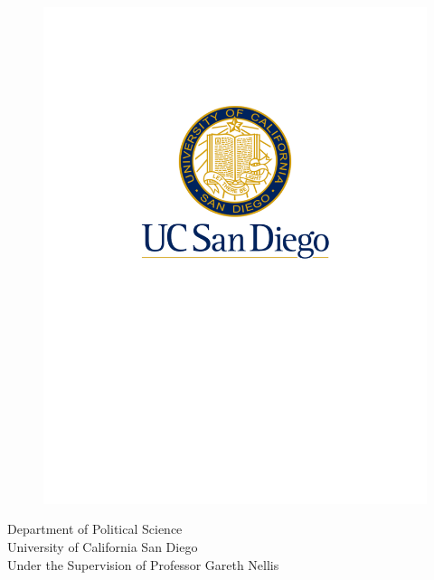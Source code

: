 \documentclass[letterpaper, 12pt]{article}
\begin{document}
\begin{titlepage}
\begingroup
\begin{figure}[!h]
    \centering
    \includegraphics[scale=0.35]{Visuals/UCSD_logo.pdf}
\end{figure}
\begin{center}
\fontsize{12}{14} \selectfont
    Department of Political Science \\
    University of California San Diego\\
Under the Supervision of Professor Gareth Nellis \\
\end{center}

\endgroup


\end{titlepage}
\end{document}

